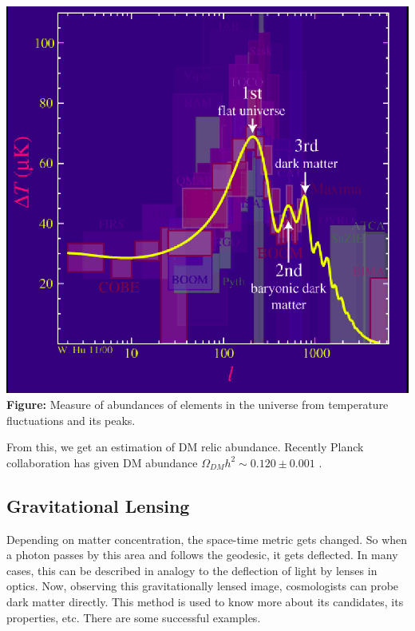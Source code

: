 \documentclass[12pt]{report}
\begin{document}
  
  \begin{center}
  \includegraphics[scale=0.3]{PEAKS.png}\\
  \textbf{Figure:} Measure of abundances of elements in the universe from temperature fluctuations and its peaks.   \cite{whu}
  \end{center}
  
 
 From this, we get an estimation of DM relic abundance. Recently Planck collaboration has given DM abundance $\Omega_{DM}h^2 \sim 0.120 \pm 0.001 $ \cite{pcolab}.\\


\subsection{Gravitational Lensing}
Depending on matter concentration, the space-time metric gets changed. So when a photon passes by this area and follows the geodesic, it gets deflected. In many cases, this can be described in analogy to the deflection of light by lenses in optics. Now, observing this gravitationally lensed image, cosmologists can probe dark matter directly. This method is used to know more about its candidates, its properties, etc. There are some successful examples. \cite{glensing}
\end{document}
